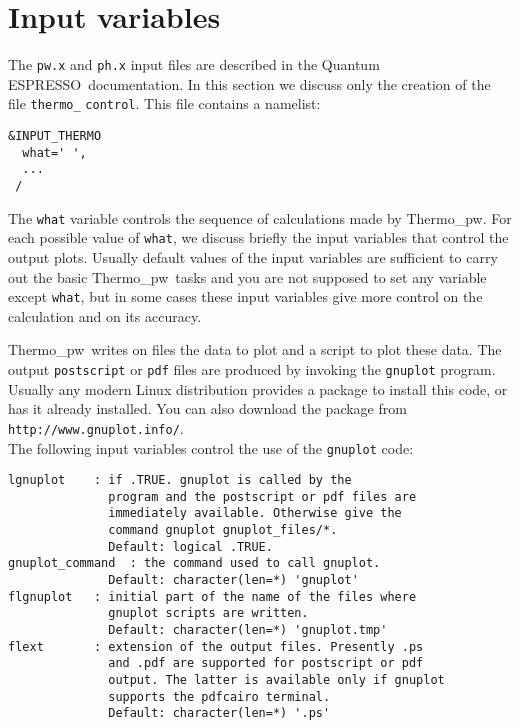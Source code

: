\documentclass[12pt,a4paper,twoside]{report}
\def\qe{{\sc Quantum ESPRESSO}}
\def\thermo{{\sc Thermo}\_{\sc pw}}
\begin{document}
{\color{dark-blue}\chapter{Input variables}}
\color{black}

The \texttt{pw.x} and \texttt{ph.x} input files are described in the \qe\ documentation.
In this section we discuss only the creation of the file
\texttt{thermo\_} \texttt{control}. This file contains a namelist:  

\begin{verbatim}
&INPUT_THERMO
  what=' ',
  ...
 /
\end{verbatim}

The \texttt{what} variable controls the sequence of calculations made
by \thermo. For each possible value of \texttt{what}, we discuss briefly the
input variables that control the output plots. Usually
default values of the input variables are sufficient to carry out  
the basic \thermo\ tasks and you are not supposed to set any variable except
\texttt{what}, but in some cases these input variables give more control
on the calculation and on its accuracy.

\thermo\ writes on files the data to plot and a script to plot
these data. The output \texttt{postscript} or \texttt{pdf} files are produced 
by invoking the 
\texttt{gnuplot} program. Usually any modern Linux 
distribution provides a package to install this code, or has it already 
installed. You can also download the package from 
\texttt{http://www.gnuplot.info/}. \\
The following input variables control the use of the \texttt{gnuplot} code:

\begin{verbatim}
lgnuplot    : if .TRUE. gnuplot is called by the 
              program and the postscript or pdf files are 
              immediately available. Otherwise give the 
              command gnuplot gnuplot_files/*.
              Default: logical .TRUE.
gnuplot_command  : the command used to call gnuplot.
              Default: character(len=*) 'gnuplot'
flgnuplot   : initial part of the name of the files where 
              gnuplot scripts are written.
              Default: character(len=*) 'gnuplot.tmp'
flext       : extension of the output files. Presently .ps 
              and .pdf are supported for postscript or pdf 
              output. The latter is available only if gnuplot 
              supports the pdfcairo terminal.
              Default: character(len=*) '.ps'
\end{verbatim}
\end{document}
